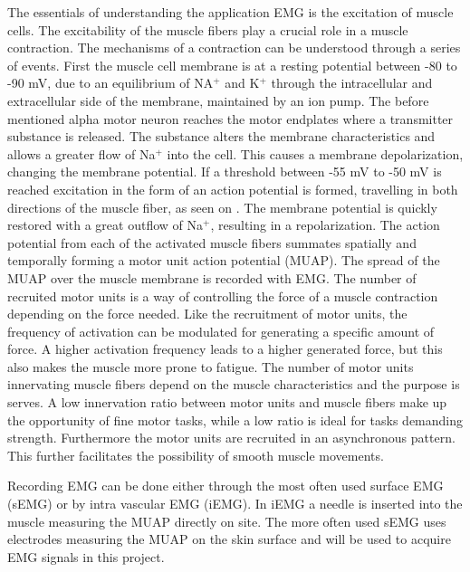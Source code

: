 The essentials of understanding the application EMG is the excitation of muscle cells. The excitability of the muscle fibers play a crucial role in a muscle contraction. The mechanisms of a contraction can be understood through a series of events. First the muscle cell membrane is at a resting potential between -80 to -90 mV, due to an equilibrium of NA$^+$ and K$^+$ through the intracellular and extracellular side of the membrane, maintained by an ion pump. The before mentioned alpha motor neuron reaches the motor endplates where a transmitter substance is released. The substance alters the membrane characteristics and allows a greater flow of Na$^+$ into the cell. This causes a membrane depolarization, changing the membrane potential. If a threshold between -55 mV to -50 mV is reached excitation in the form of an action potential is formed, travelling in both directions of the muscle fiber, as seen on . The membrane potential is quickly restored with a great outflow of Na$^+$, resulting in a repolarization. The action potential from each of the activated muscle fibers summates spatially and temporally forming a motor unit action potential (MUAP). The spread of the MUAP over the muscle membrane is recorded with EMG. The number of recruited motor units is a way of controlling the force of a muscle contraction depending on the force needed. Like the recruitment of motor units, the frequency of activation can be modulated for generating a specific amount of force. A higher activation frequency leads to a higher generated force, but this also makes the muscle more prone to fatigue. The number of motor units innervating muscle fibers depend on the muscle characteristics and the purpose is serves. A low innervation ratio between motor units and muscle fibers make up the opportunity of fine motor tasks, while a low ratio is ideal for tasks demanding strength. Furthermore the motor units are recruited in an asynchronous pattern. This further facilitates the possibility of smooth muscle movements. \cite{Martini2012, Cram2012} 

Recording EMG can be done either through the most often used surface EMG (sEMG) or by intra vascular EMG (iEMG). In iEMG a needle is inserted into the muscle measuring the MUAP directly on site. The more often used sEMG uses electrodes measuring the MUAP on the skin surface and will be used to acquire EMG signals in this project. \cite{Cram2012} 
